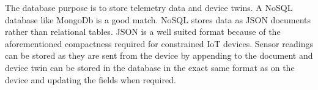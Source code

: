 The database purpose is to store telemetry data and device twins. A NoSQL database like MongoDb is a good match. NoSQL stores data as JSON documents rather than relational tables. JSON is a well suited format because of the aforementioned compactness required for constrained IoT devices. Sensor readings can be stored as they are sent from the device by appending to the document and device twin can be stored in the database in the exact same format as on the device and updating the fields when required. 
